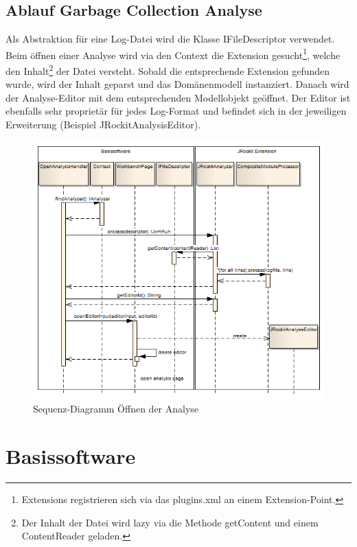 \subsection{Ablauf Garbage Collection Analyse}
Als Abstraktion für eine Log-Datei wird die Klasse IFileDescriptor verwendet. Beim öffnen einer Analyse wird via den Context die Extension gesucht\footnote{Extensions registrieren sich via das plugins.xml an einem Extension-Point. }, welche den Inhalt\footnote{Der Inhalt der Datei wird lazy via die Methode getContent und einem ContentReader geladen.} der Datei versteht. Sobald die entsprechende Extension gefunden wurde, wird der Inhalt geparst und das Domänenmodell instanziert.
Danach wird der Analyse-Editor mit dem entsprechenden Modellobjekt geöffnet. Der Editor ist ebenfalls sehr proprietär für jedes Log-Format und befindet sich in der jeweiligen Erweiterung (Beispiel JRockitAnalysisEditor). 
 \begin{figure}[H]
  	\centering
    	\includegraphics[width=16cm]{images/core_sequence_analysis}
	\caption{Sequenz-Diagramm Öffnen der Analyse}
\end{figure}
\section{Basissoftware}
